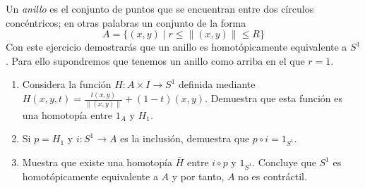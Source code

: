 \documentclass{standalone}
\begin{document}
	\begin{exercise}
		Un \emph{anillo} es el conjunto de puntos que se encuentran entre dos círculos concéntricos; en otras palabras un conjunto de la forma
		\[
		A = \{(x,y) \mid r\leq \|(x,y)\|\leq R\}
		\] Con este ejercicio demostrarás que un anillo es homotópicamente equivalente a $S^{1}$. Para ello supondremos que tenemos un anillo como arriba en el que $r=1$.
		
		\begin{enumerate}
			\item Considera la función $H\colon A\times I\rightarrow S^{1}$ definida mediante $H(x,y, t) = \frac{t(x,y)}{\|(x,y)\|} + (1-t)(x,y)$. Demuestra que esta función es una homotopía entre $1_{A}$ y $H_{1}$. 
			\item Si $p = H_{1}$ y $i\colon S^{1}\rightarrow A$ es la inclusión, demuestra que $p\circ i = 1_{S^{1}}$.
			\item Muestra que existe una homotopía $\bar{H}$ entre $i\circ p$ y $1_{S^{1}}$. Concluye que $S^{1}$ es homotópicamente equivalente a $A$ y por tanto, $A$ no es contráctil.
		\end{enumerate}
	\end{exercise}
	
\end{document}
